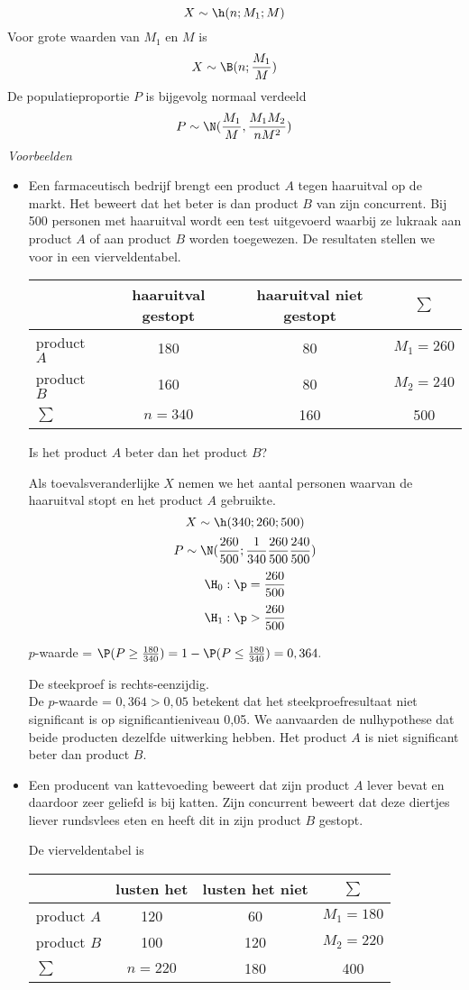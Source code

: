 {$$X\sim \h(n;M_1;M)$$
Voor grote waarden van $M_1$ en $M$ is
$$X\sim\B(n;\frac{M_1}{M})$$
De populatieproportie $P$ is bijgevolg normaal verdeeld
$$P\sim \N(\frac{M_1}{M},\frac{M_1M_2}{nM^2})$$
\newpage
{\em Voorbeelden}
\begin{itemize}
\item
Een farmaceutisch bedrijf brengt een product $A$ tegen haaruitval op de markt. 
Het beweert dat het beter is dan product $B$ van zijn concurrent. Bij 500 
personen met haaruitval wordt een test uitgevoerd waarbij ze lukraak aan 
product $A$ of aan product $B$ worden toegewezen. De resultaten stellen we voor
in een vierveldentabel.

\begin{center}
\begin{tabular}{l|c|c|c}
  & haaruitval gestopt & haaruitval niet gestopt & $\sum$\\
  \hline
product $A$ & 180 & 80 & $M_1=260$\\
  \hline
product $B$ & 160 & 80 & $M_2=240$\\
  \hline
$\sum$ & $n=340$ & 160 & 500
\end{tabular}
  \end{center}

Is het product $A$ beter dan het product $B$?

Als toevalsveranderlijke $X$ nemen we het aantal personen waarvan de 
haaruitval stopt en het product $A$ gebruikte.
$$X\sim\h(340;260;500)$$
$$P\sim\N(\frac{260}{500};\frac{1}{340}\frac{260}{500}\frac{240}{500})$$
$$\H_0: \p=\frac{260}{500}$$
$$\H_1: \p>\frac{260}{500}$$

$p$-waarde = $\P(P\geq \frac{180}{340})=1-\P(P\leq\frac{180}{340})=0,364.$

De steekproef is rechts-eenzijdig.\\
De $p$-waarde = $0,364> 0,05$ betekent dat het steekproefresultaat niet significant is op 
significantieniveau 0,05. We aanvaarden de nulhypothese dat beide producten 
dezelfde uitwerking hebben. Het product $A$ is niet significant beter dan 
product 
$B$.


\item Een producent van kattevoeding beweert dat zijn product $A$ lever bevat 
en 
daardoor zeer geliefd is bij katten. Zijn concurrent beweert dat deze diertjes 
liever rundsvlees eten en heeft dit in zijn product $B$ gestopt.

De vierveldentabel is

\begin{center}
\begin{tabular}{l|c|c|c}
  & lusten het & lusten het niet & $\sum$\\
  \hline
product $A$ & 120 & 60 & $M_1=180$\\
  \hline
product $B$ & 100 & 120 & $M_2=220$\\
  \hline
$\sum$ & $n=220$ & 180 & 400
\end{tabular}
  \end{center}


\end{itemize}}
